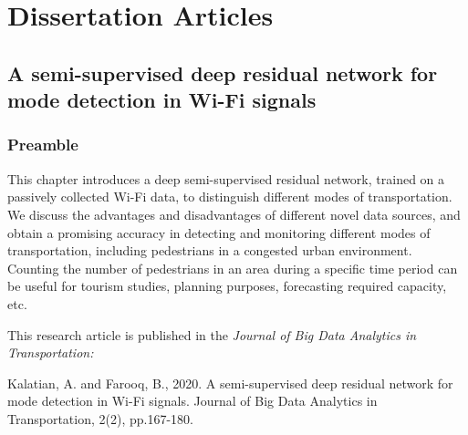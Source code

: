\part{Dissertation Articles}
\label{part_2:dissertation_articles}
\chapter{A semi-supervised deep residual network for mode detection in Wi-Fi signals}
\label{chap2}
\thispagestyle{empty}

\section*{Preamble}
This chapter introduces a deep semi-supervised residual network, trained on a passively collected Wi-Fi data, to distinguish different modes of transportation. We discuss the advantages and disadvantages of different novel data sources, and obtain a promising accuracy in detecting and monitoring different modes of transportation, including pedestrians in a congested urban environment. Counting the number of pedestrians in an area during a specific time period can be useful for tourism studies, planning purposes, forecasting required capacity, etc.

\vspace{1em}
\noindent
This research article is published in the \textit{Journal of Big Data Analytics in Transportation:}

\vspace{1em}
\noindent
Kalatian, A. and Farooq, B., 2020. A semi-supervised deep residual network for mode detection in Wi-Fi signals. Journal of Big Data Analytics in Transportation, 2(2), pp.167-180.


\vspace{1em}
\noindent

\clearpage


